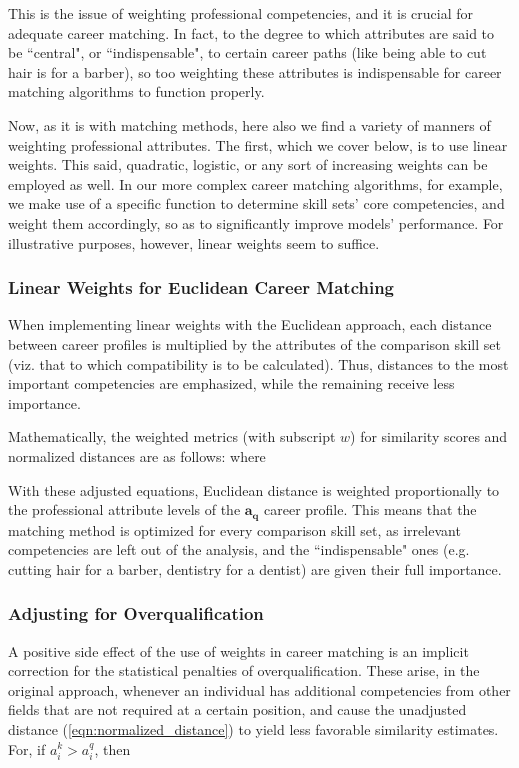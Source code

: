 \documentclass{article}
\begin{document}
This is the issue of weighting professional competencies, and it is crucial for
adequate career matching. In fact, to the degree to which attributes are said
to be ``central", or ``indispensable", to certain career paths (like being able
to cut hair is for a barber), so too weighting these attributes is
indispensable for career matching algorithms to function properly.

Now, as it is with matching methods, here also we find a variety of manners of
weighting professional attributes. The first, which we cover below, is to use
linear weights. This said, quadratic, logistic, or any sort of increasing
weights can be employed as well. In our more complex career matching
algorithms, for example, we make use of a specific function to determine skill
sets' core competencies, and weight them accordingly, so as to significantly
improve models' performance. For illustrative purposes, however, linear weights
seem to suffice.

\subsubsection{Linear Weights for Euclidean Career Matching}
When implementing linear weights with the Euclidean approach, each distance
between career profiles is multiplied by the attributes of the comparison skill
set (viz. that to which compatibility is to be calculated). Thus, distances to
the most important competencies are emphasized, while the remaining receive
less importance.

Mathematically, the weighted metrics (with subscript $w$) for similarity scores
and normalized distances are as follows: \EqnWeightedSimilarity where
\EqnWeightedDistance

With these adjusted equations, Euclidean distance is weighted proportionally to
the professional attribute levels of the $\boldsymbol{a_{q}}$ career profile.
This means that the matching method is optimized for every comparison skill
set, as irrelevant competencies are left out of the analysis, and the
``indispensable" ones (e.g. cutting hair for a barber, dentistry for a dentist)
are given their full importance.

\subsubsection{Adjusting for Overqualification}
A positive side effect of the use of weights in career matching is an implicit
correction for the statistical penalties of overqualification. These arise, in
the original approach, whenever an individual has additional competencies from
other fields that are not required at a certain position, and cause the
unadjusted distance (\ref{eqn:normalized_distance}) to yield less favorable
similarity estimates. For, if $a_{i}^{k} > a_{i}^{q}$, then
\EqnDistanceDerivative
\end{document}
